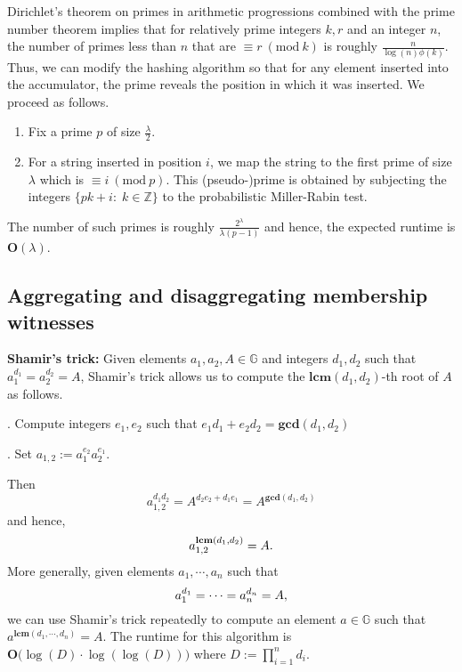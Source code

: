 \documentclass[11pt, lettersize, notitlepage, leqno, footskip=0.6cm]{article}
\newcommand{\bz}{\mathbb Z}
\newcommand{\mb}{\mathbb}
\newcommand{\mbf}{\mathbf}
\newcommand{\lam}{\lambda}
\newcommand{\vs}{\vspace{-0.15cm}}
\newcommand{\noin}{\noindent}
\newcommand{\Mod}[1]{\ (\mathrm{mod}\ #1)}
\newcommand{\LCM}{\mbf{lcm}}
\newcommand{\GCD}{\mbf{gcd}}
\numberwithin{equation}{section}
\begin{document}
Dirichlet's theorem on primes in arithmetic progressions combined with the prime number theorem implies that for relatively prime integers $k,r$ and an integer $n$, the number of primes less than $n$ that are $\equiv r\Mod{k}$ is roughly $\frac{n}{\log(n)\phi(k)}$. Thus, we can modify the hashing algorithm so that for any element inserted into the accumulator, the prime reveals the position in which it was inserted. We proceed as follows.\begin{enumerate}[wide, labelwidth=!, labelindent=0pt]\vspace{-0.1cm} 

\item Fix a prime $p$ of size $\frac{\lam}{2}$. \vs 

\item For a string inserted in position $i$, we map the string to the first prime of size $\lam$ which is $\equiv i\Mod{p}$. This (pseudo-)prime is obtained by subjecting the integers $\{pk+i:\;k\in\bz\}$ to the probabilistic Miller-Rabin test. \end{enumerate} 

\noin The number of such primes is roughly \vs $\frac{2^{\lam}}{\lam (p-1)}$ and hence, the expected runtime is $\mbf{O}(\lam)$.






\subsection{\fontsize{11}{11}\selectfont Aggregating and disaggregating membership witnesses}

\noin \textbf{Shamir's trick:} Given elements $a_1, a_2, A\in \mb{G}$ and integers $d_1, d_2$ such that $a_1^{d_1} = a_2^{d_2} = A$, Shamir's trick allows us to compute the $\LCM(d_1, d_2)$-th root of $A$ as follows.\vspace{0.1cm}

\noin 1. Compute integers $e_1, e_2$ such that $e_1d_1+e_2d_2 = \GCD(d_1, d_2)$

\noin 2. Set $a_{1,2}:= a_1^{e_2}a_2^{e_1} $. 

\noin Then \vspace{-0.15cm}$$a_{1,2}^{d_1d_2} = A^{d_2e_2 + d_1e_1} = A^{\GCD(d_1,d_2)}$$ and hence, \vs $$a_{1,2}^{\LCM(d_1,d_2)} = A. \vs $$ More generally, given elements $a_1,\cdots,a_n$ such that \vs $$a_1^{d_1} = \cdots = a_n^{d_n} = A, \vs $$ we can use Shamir's trick repeatedly to compute an element $a\in\mb{G}$ such that $a^{\LCM(d_1,\cdots,d_n)} = A.$ The runtime for this algorithm is $\mbf{O}\big(\log(D)\cdot \log(\log(D))\big)$ where $D:= \prod_{i=1}^n d_i$.
\end{document}
